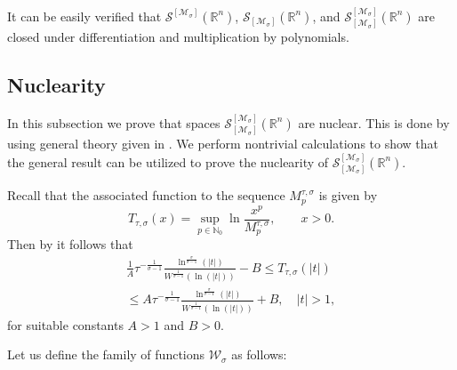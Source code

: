 \documentclass{article}
\theoremstyle{thmstyleone}
\theoremstyle{thmstyletwo}%
\theoremstyle{thmstylethree}%
\begin{document}
It can be easily verified that
$\mathcal S^{ [\mathcal{M}_\sigma]} (\mathbb R^n)$,
$\mathcal S_{ [\mathcal{M}_\sigma]} (\mathbb R^n)$, and
$\mathcal S_{[\mathcal{M}_\sigma ] }^{ [\mathcal{M}_\sigma]} (\mathbb R^n)$ are 
closed under differentiation and multiplication by polynomials.






\subsection{Nuclearity}

In this subsection we prove that spaces $\mathcal S_{[\mathcal{M}_\sigma ] }^{ [\mathcal{M}_\sigma]} (\mathbb R^n)$ are nuclear.
This is done by using general theory given in \cite{DNV2021}.
We perform nontrivial calculations to show 
that the general result \cite[Theorem 5.1]{DNV2021} 
can be utilized to prove the nuclearity of 
$\mathcal S_{[\mathcal{M}_\sigma ] }^{ [\mathcal{M}_\sigma]} (\mathbb R^n)$.

Recall that the associated function to the sequence $M^{\tau,\sigma}_p$ is given by 
\begin{equation}
    \label{eq:associated-function}
T_{\tau,\sigma}(x)=\sup_{p\in \mathbb{N}_0}\ln \frac{x^p}{M^{\tau, \sigma}_p}, \qquad
x>0. 
\end{equation}
Then by \cite[Proposition 2]{TT0}
it follows that
\begin{multline}
\label{nejednakostAsocirana}
\frac{1}{A}  \tau^{-\frac{1}{\sigma-1}} \frac{\ln^{\frac{\sigma}{\sigma-1}}(|t|)}{W^{\frac{1}{\sigma-1}}(\ln(|t|))}-B
 \leq T_{\tau,\sigma}(|t|) 
\\
 \leq A  \tau^{-\frac{1}{\sigma-1}} 
\frac{\ln^{\frac{\sigma}{\sigma-1}}(|t|)}{W^{\frac{1}{\sigma-1}}(\ln(|t|))}+B, \quad |t| > 1,
\end{multline}
for suitable constants $A>1$ and $B>0$.


Let us define the family of functions $\mathcal{W}_{\sigma} $ as follows:

\end{document}

